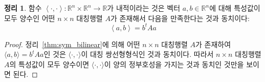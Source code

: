 \documentclass[unfonts,oneside,a4paper]{oblivoir}
\theoremstyle{definition}
\theoremstyle{theorem}
\newtheorem{theorem}{정리}[section]
\theoremstyle{theorem}
\theoremstyle{remark}
\theoremstyle{remark}
\theoremstyle{remark}
\theoremstyle{remark}
\renewcommand{\vec}[1]{\bm{\mathit{#1}}}
\begin{document}
\begin{theorem}
    함수 $\left<\cdot, \cdot\right>: \mathbb R^n \times \mathbb R^n \rightarrow \mathbb R$가 내적이라는 것은 벡터 $\vec a, \vec b \in \mathbb R^n$에 대해 특성값이 모두 양수인 어떤 $n \times n$ 대칭행렬 $A$가 존재해서 다음을 만족한다는 것과 동치이다:
    \begin{equation*}
        \left<\vec a, \vec b\right> = \vec b^t A \vec a
    \end{equation*}
\end{theorem}

\begin{proof}
    정리~\ref{thm:sym_bilinear}에 의해 어떤 $n \times n$ 대칭행렬 $A$가 존재하여 $\langle \vec a, \vec b \rangle = \vec b^t A \vec a$인 것은 $\langle\cdot, \cdot\rangle$이 대칭 쌍선형형식인 것과 동치이다.
    따라서 $n \times n$ 대칭행렬 $A$의 특성값이 모두 양수이면 $\langle \cdot, \cdot \rangle$이 양의 정부호성을 가지는 것과 동치인 것만을 보이면 된다.


\end{proof}
\end{document}
